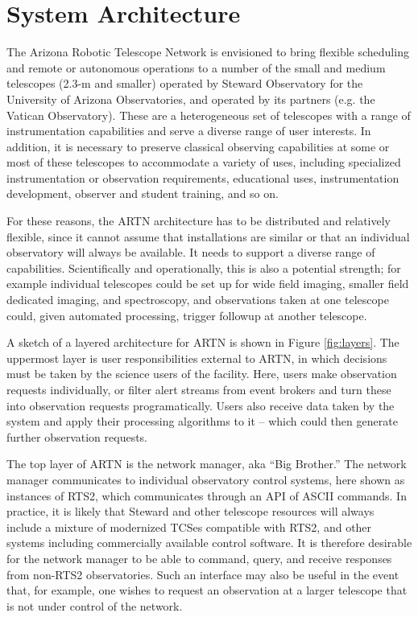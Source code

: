 \documentclass[]{spie}  %
\begin{document}
\section{System Architecture}

The Arizona Robotic Telescope Network is envisioned to bring flexible
scheduling and remote or autonomous operations to a number of the small and medium telescopes (2.3-m and smaller) operated by Steward Observatory for the University of Arizona Observatories, and operated by its partners (e.g. the Vatican Observatory). These are a heterogeneous set of telescopes with a range of instrumentation capabilities and serve a diverse range of user interests.  In addition, it is necessary to preserve classical observing capabilities at some or most of these telescopes to accommodate a variety of uses, including specialized instrumentation or observation requirements, educational uses, instrumentation development, observer and student training, and so on.  

For these reasons, the ARTN architecture has to be distributed and relatively flexible, since it cannot assume that installations are similar or that an individual observatory will always be available. It needs to support a diverse range of capabilities. Scientifically and operationally, this is also a potential strength; for example individual telescopes could be set up for wide field imaging, smaller field dedicated imaging, and spectroscopy, and observations taken at one telescope could, given automated processing, trigger followup at another telescope.

A sketch of a layered architecture for ARTN is shown in Figure \ref{fig:layers}. The uppermost layer is user responsibilities external to ARTN, in which decisions must be taken by the science users of the facility.  Here, users make observation requests individually, or filter alert streams from event brokers and turn these into observation requests programatically. Users also receive data taken by the system and apply their processing algorithms to it -- which could then generate further observation requests.

The top layer of ARTN is the network manager, aka ``Big Brother.'' 
The network manager communicates to individual observatory control systems, here shown as instances of RTS2, which communicates through an API of ASCII commands. In practice, it is likely that Steward and other telescope resources will always include a mixture of modernized TCSes compatible with RTS2, and other systems including commercially available control software. It is therefore desirable for the network manager to be able to command, query, and receive responses from non-RTS2 observatories. Such an interface may also be useful in the event that, for example, one wishes to request an observation at a larger telescope that is not under control of the network.
\end{document}
